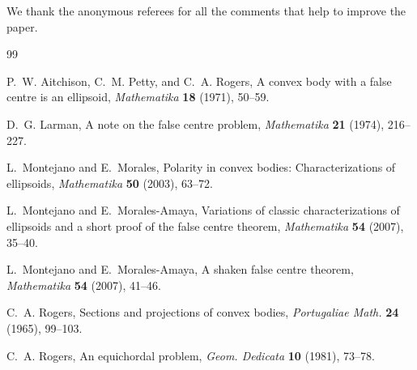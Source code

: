 \documentclass[12pt]{article}
\begin{document}
\bigskip
We thank the anonymous referees for all the comments that help to improve the paper.
\begin{thebibliography}{99}
	
	P.~W. Aitchison, C.~M. Petty, and C.~A. Rogers, 
	\newblock A convex body with a false centre is an ellipsoid, 
	\newblock \emph{Mathematika} \textbf{18} (1971), 50--59.
	
	D.~G. Larman,
	\newblock A note on the false centre problem, 
	\newblock \emph{Mathematika} \textbf{21} (1974), 216--227.
	
	L.~Montejano and E.~Morales, 
	\newblock Polarity in convex bodies: Characterizations of ellipsoids, 
	\newblock \emph{Mathematika} \textbf{50} (2003), 63--72.
	
	L.~Montejano and E.~Morales-Amaya, 
	\newblock Variations of classic characterizations of ellipsoids and a short proof of the false centre theorem, 
	\newblock \emph{Mathematika} \textbf{54} (2007), 35--40.
	
	L.~Montejano and E.~Morales-Amaya, 
	\newblock A shaken false centre theorem, 
	\newblock \emph{Mathematika} \textbf{54} (2007), 41--46.
	
	C.~A. Rogers, 
	\newblock Sections and projections of convex bodies, 
	\newblock \emph{Portugaliae Math.} \textbf{24} (1965), 99--103.
	
	C.~A. Rogers, 
	\newblock An equichordal problem, 
	\newblock \emph{Geom. Dedicata} \textbf{10} (1981), 73--78.
	
\end{thebibliography}


	
	
\end{document}
